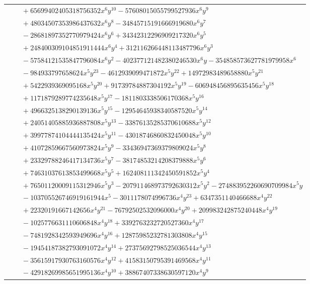 \documentclass[11pt]{article}
\begin{document}
\begin{longtable}{@{}ll@{}}
 & $\quad +65699402405318756352x^{6}y^{10}-57608015055799527936x^{6}y^{9}$\\
 & $\quad +48034507353986437632x^{6}y^{8}-34845715191666919680x^{6}y^{7}$\\
 & $\quad -28681897352770979424x^{6}y^{6}+34342312296909217320x^{6}y^{5}$\\
 & $\quad +248400309104851911444x^{6}y^{4}+312116266448113487796x^{6}y^{3}$\\
 & $\quad -57584121535847796084x^{6}y^{2}-402377121482380246530x^{6}y-354858573627781979958x^{6}$\\
 & $\quad -984933797658624x^{5}y^{23}-4612939099471872x^{5}y^{22}+14972983489658880x^{5}y^{21}$\\
 & $\quad +5422939369095168x^{5}y^{20}+91739784887304192x^{5}y^{19}-606948456895635456x^{5}y^{18}$\\
 & $\quad +1171879289774235648x^{5}y^{17}-1811803338506170368x^{5}y^{16}$\\
 & $\quad +4966325138290139136x^{5}y^{15}-12954645938340587520x^{5}y^{14}$\\
 & $\quad +24051405885936887808x^{5}y^{13}-33876135285370610688x^{5}y^{12}$\\
 & $\quad +39977874104444135424x^{5}y^{11}-43018746860832450048x^{5}y^{10}$\\
 & $\quad +41072859667560973824x^{5}y^{9}-33436947369379809024x^{5}y^{8}$\\
 & $\quad +23329788246417134736x^{5}y^{7}-38174853214208379888x^{5}y^{6}$\\
 & $\quad +74631037613853499668x^{5}y^{5}+162408111342450591852x^{5}y^{4}$\\
 & $\quad +76501120009115312946x^{5}y^{3}-207911468973792630312x^{5}y^{2}-274883952260690709984x^{5}y$\\
 & $\quad -103705526746919161944x^{5}-3011178074996736x^{4}y^{23}+6347351140466688x^{4}y^{22}$\\
 & $\quad +22320191667142656x^{4}y^{21}-76792502532096000x^{4}y^{20}+209983242875240448x^{4}y^{19}$\\
 & $\quad -1025776631110606848x^{4}y^{18}+3392763232720527360x^{4}y^{17}$\\
 & $\quad -7481928342593949696x^{4}y^{16}+12875985232781303808x^{4}y^{15}$\\
 & $\quad -19454187382793091072x^{4}y^{14}+27375692798525036544x^{4}y^{13}$\\
 & $\quad -35615917930763160576x^{4}y^{12}+41583150795391469568x^{4}y^{11}$\\
 & $\quad -42918269985651995136x^{4}y^{10}+38867407338630597120x^{4}y^{9}$\\

\end{longtable}
\end{document}
